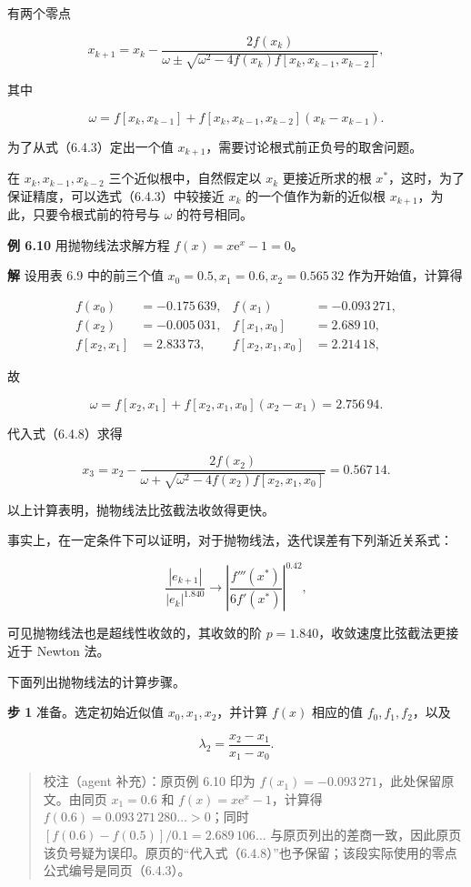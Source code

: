 \documentclass[
  10pt,
  fontset=fandol]{ctexart}
\begin{document}
有两个零点

\[
x_{k+1}=x_k-\frac{2f(x_k)}{\omega\pm\sqrt{\omega^2-4f(x_k)f[x_k,x_{k-1},x_{k-2}]}},
\tag{6.4.3}
\]

其中

\[
\omega=f[x_k,x_{k-1}]+f[x_k,x_{k-1},x_{k-2}](x_k-x_{k-1}).
\]

为了从式（6.4.3）定出一个值 \(x_{k+1}\)，需要讨论根式前正负号的取舍问题。

在 \(x_k,x_{k-1},x_{k-2}\) 三个近似根中，自然假定以 \(x_k\) 更接近所求的根 \(x^*\)，这时，为了保证精度，可以选式（6.4.3）中较接近 \(x_k\) 的一个值作为新的近似根 \(x_{k+1}\)，为此，只要令根式前的符号与 \(\omega\) 的符号相同。

\textbf{例 6.10} 用抛物线法求解方程 \(f(x)=x\mathrm{e}^x-1=0\)。

\textbf{解} 设用表 6.9 中的前三个值 \(x_0=0.5,x_1=0.6,x_2=0.565\,32\) 作为开始值，计算得

\[
\begin{aligned}
f(x_0)&=-0.175\,639,& f(x_1)&=-0.093\,271,\\
f(x_2)&=-0.005\,031,& f[x_1,x_0]&=2.689\,10,\\
f[x_2,x_1]&=2.833\,73,& f[x_2,x_1,x_0]&=2.214\,18,
\end{aligned}
\]

故

\[
\omega=f[x_2,x_1]+f[x_2,x_1,x_0](x_2-x_1)=2.756\,94.
\]

代入式（6.4.8）求得

\[
x_3=x_2-\frac{2f(x_2)}{\omega+\sqrt{\omega^2-4f(x_2)f[x_2,x_1,x_0]}}=0.567\,14.
\]

以上计算表明，抛物线法比弦截法收敛得更快。

事实上，在一定条件下可以证明，对于抛物线法，迭代误差有下列渐近关系式：

\[
\frac{|e_{k+1}|}{|e_k|^{1.840}}\to\left|\frac{f'''(x^*)}{6f'(x^*)}\right|^{0.42},
\]

可见抛物线法也是超线性收敛的，其收敛的阶 \(p=1.840\)，收敛速度比弦截法更接近于 Newton 法。

下面列出抛物线法的计算步骤。

\textbf{步 1} 准备。选定初始近似值 \(x_0,x_1,x_2\)，并计算 \(f(x)\) 相应的值 \(f_0,f_1,f_2\)，以及

\[
\lambda_2=\frac{x_2-x_1}{x_1-x_0}.
\]

\begin{quote}
校注（agent 补充）：原页例 6.10 印为 \(f(x_1)=-0.093\,271\)，此处保留原文。由同页 \(x_1=0.6\) 和 \(f(x)=x\mathrm{e}^x-1\)，计算得 \(f(0.6)=0.093\,271\,280\ldots>0\)；同时 \([f(0.6)-f(0.5)]/0.1=2.689\,106\ldots\) 与原页列出的差商一致，因此原页该负号疑为误印。原页的``代入式（6.4.8）''也予保留；该段实际使用的零点公式编号是同页（6.4.3）。
\end{quote}
\end{document}
